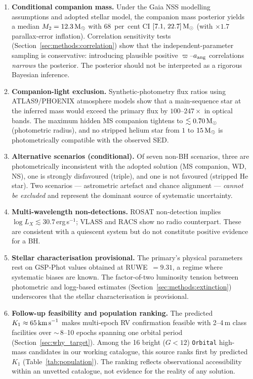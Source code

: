 \documentclass[usenatbib,fleqn]{mnras}
\newcommand{\Msun}{{\rm M}_\odot}
\newcommand{\kms}{{\rm km\,s}^{-1}}
\begin{document}
\begin{enumerate}
\item \textbf{Conditional companion mass.}
  Under the Gaia NSS modelling assumptions and adopted stellar
  model, the companion mass posterior yields a median
  $M_2 = 12.3\,\Msun$ with 68~per~cent CI
  $[7.1,\,22.7]\,\Msun$ (with $\times 1.7$ parallax-error
  inflation).  Correlation sensitivity tests
  (Section~\ref{sec:methods:correlation}) show that the
  independent-parameter sampling is conservative: introducing
  plausible positive $\varpi$--$a_{\rm ang}$ correlations
  \emph{narrows} the posterior.  The posterior should not be
  interpreted as a rigorous Bayesian inference.

\item \textbf{Companion-light exclusion.}
  Synthetic-photometry flux ratios using ATLAS9/PHOENIX
  atmosphere models show that a main-sequence star at the
  inferred mass would exceed the primary flux by
  $100$--$247\times$ in optical bands.  The maximum hidden MS
  companion tightens to $\lesssim 0.70\,\Msun$ (photometric
  radius), and no stripped helium star from $1$ to
  $15\,\Msun$ is photometrically compatible with the observed SED.

\item \textbf{Alternative scenarios (conditional).}
  Of seven non-BH scenarios, three are photometrically
  inconsistent with the adopted solution (MS companion, WD, NS),
  one is strongly disfavoured (triple), and one is not favoured
  (stripped He star).  Two scenarios --- astrometric artefact and
  chance alignment --- \emph{cannot be excluded} and represent the
  dominant source of systematic uncertainty.

\item \textbf{Multi-wavelength non-detections.}
  ROSAT non-detection implies
  $\log L_X \lesssim 30.7$\,erg\,s$^{-1}$; VLASS and RACS
  show no radio counterpart.  These are consistent with a
  quiescent system but do not constitute positive evidence for a BH.

\item \textbf{Stellar characterisation provisional.}
  The primary's physical parameters rest on GSP-Phot values
  obtained at RUWE~$= 9.31$, a regime where systematic biases
  are known.  The factor-of-two luminosity tension between
  photometric and logg-based estimates
  (Section~\ref{sec:methods:extinction}) underscores that the
  stellar characterisation is provisional.

\item \textbf{Follow-up feasibility and population ranking.}
  The predicted $K_1 \approx 65\,\kms$ makes multi-epoch
  RV confirmation feasible with 2--4\,m class facilities
  over $\sim$\,8--10 epochs spanning one orbital period
  (Section~\ref{sec:why_target}).  Among the 16 bright
  ($G < 12$) \texttt{Orbital} high-mass candidates in our working
  catalogue, this source ranks first by predicted $K_1$
  (Table~\ref{tab:population}).  The ranking reflects
  observational accessibility within an unvetted catalogue,
  not evidence for the reality of any solution.


\end{enumerate}
\end{document}
